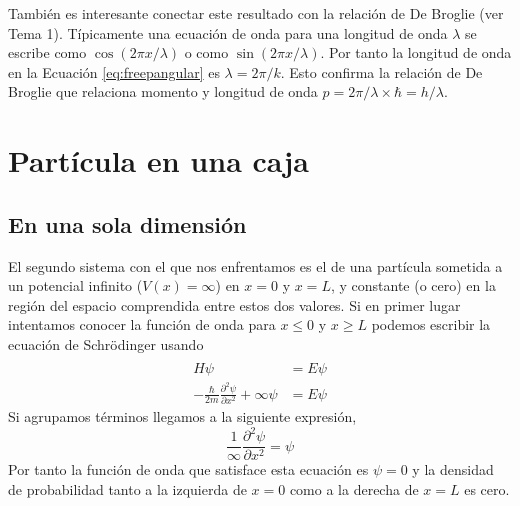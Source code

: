 \documentclass{tufte-handout}
\begin{document}
También es interesante conectar este resultado 
con la relación de De Broglie (ver Tema 1). 
Típicamente una ecuación de
onda para una longitud de onda $\lambda$ se
escribe como $\cos(2\pi x/\lambda)$ o como
$\sin(2\pi x/\lambda)$. Por tanto la longitud de
onda en la Ecuación \ref{eq:freepangular} es
$\lambda=2\pi/k$. Esto confirma la relación de 
De Broglie que relaciona momento y longitud de
onda $p=2\pi/\lambda\times\hbar=h/\lambda$.

\section{Partícula en una caja}
\subsection{En una sola dimensión}
El segundo sistema con el que nos enfrentamos es el de una partícula
sometida a un potencial infinito ($V(x)=\infty$) en $x=0$ y $x=L$, y 
constante (o cero) en la región del espacio comprendida entre estos
dos valores. Si en primer lugar intentamos conocer la función de onda
para $x\leq 0$ y $x\geq L$ podemos escribir la ecuación de Schrödinger
usando
\begin{subequations}
    \begin{align}
         \hat{H}\psi &=E\psi  \\
         -\frac{\hbar}{2m}\frac{\partial^2\psi}{\partial x^2} + \infty\psi &=E\psi
    \end{align}    
\end{subequations}
Si agrupamos términos llegamos a la siguiente expresión,
\begin{equation}
\frac{1}{\infty}\frac{\partial^2\psi}{\partial x^2} = \psi 
\end{equation}
Por tanto la función de onda que satisface esta ecuación es
$\psi=0$ y la densidad de probabilidad tanto a la izquierda 
de $x=0$ como a la derecha de $x=L$ es cero.
\end{document}

